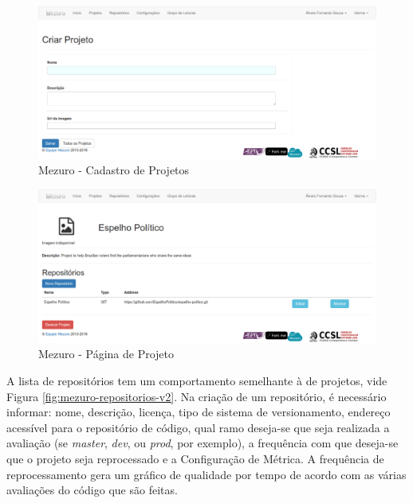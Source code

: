 \begin{figure}[!htb]
	\centering
    \includegraphics[keepaspectratio=true,scale=0.3]
    {figuras/mezuro-projeto-cadastro.eps}
  \caption{Mezuro - Cadastro de Projetos}
	\label{fig:mezuro-projeto-cadastro}
\end{figure}

\newpage

\begin{figure}[!htb]
	\centering
    \includegraphics[keepaspectratio=true,scale=0.3]
    {figuras/mezuro-projeto-view.eps}
  \caption{Mezuro - Página de Projeto}
	\label{fig:mezuro-projeto-view}
\end{figure}

\newpage

A lista de repositórios tem um comportamento semelhante à de projetos, vide
Figura \ref{fig:mezuro-repositorios-v2}. Na criação de um repositório, é
necessário informar: nome, descrição, licença, tipo de sistema de
versionamento, endereço acessível para o repositório de código, qual ramo
deseja-se que seja realizada a avaliação (se \textit{master},
\textit{dev}, ou \textit{prod}, por exemplo), a frequência com que deseja-se que
o projeto seja reprocessado e a Configuração de Métrica. A frequência de
reprocessamento gera um gráfico de qualidade por tempo de acordo com as várias
avaliações do código que são feitas.

